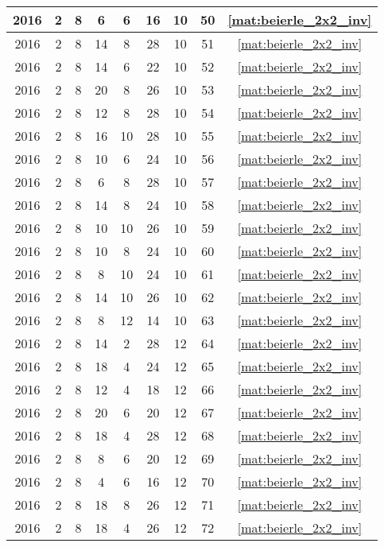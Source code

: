 \begin{longtable}{|c|c|c|c|c|c|c|c|c|}
2016 & 2 & 8 & 6 & 6 & 16 & 10 & 50 & \eqref{mat:beierle_2x2_inv} \\ \hline 
2016 & 2 & 8 & 14 & 8 & 28 & 10 & 51 & \eqref{mat:beierle_2x2_inv} \\ \hline 
2016 & 2 & 8 & 14 & 6 & 22 & 10 & 52 & \eqref{mat:beierle_2x2_inv} \\ \hline 
2016 & 2 & 8 & 20 & 8 & 26 & 10 & 53 & \eqref{mat:beierle_2x2_inv} \\ \hline 
2016 & 2 & 8 & 12 & 8 & 28 & 10 & 54 & \eqref{mat:beierle_2x2_inv} \\ \hline 
2016 & 2 & 8 & 16 & 10 & 28 & 10 & 55 & \eqref{mat:beierle_2x2_inv} \\ \hline 
2016 & 2 & 8 & 10 & 6 & 24 & 10 & 56 & \eqref{mat:beierle_2x2_inv} \\ \hline 
2016 & 2 & 8 & 6 & 8 & 28 & 10 & 57 & \eqref{mat:beierle_2x2_inv} \\ \hline 
2016 & 2 & 8 & 14 & 8 & 24 & 10 & 58 & \eqref{mat:beierle_2x2_inv} \\ \hline 
2016 & 2 & 8 & 10 & 10 & 26 & 10 & 59 & \eqref{mat:beierle_2x2_inv} \\ \hline 
2016 & 2 & 8 & 10 & 8 & 24 & 10 & 60 & \eqref{mat:beierle_2x2_inv} \\ \hline 
2016 & 2 & 8 & 8 & 10 & 24 & 10 & 61 & \eqref{mat:beierle_2x2_inv} \\ \hline 
2016 & 2 & 8 & 14 & 10 & 26 & 10 & 62 & \eqref{mat:beierle_2x2_inv} \\ \hline 
2016 & 2 & 8 & 8 & 12 & 14 & 10 & 63 & \eqref{mat:beierle_2x2_inv} \\ \hline 
2016 & 2 & 8 & 14 & 2 & 28 & 12 & 64 & \eqref{mat:beierle_2x2_inv} \\ \hline 
2016 & 2 & 8 & 18 & 4 & 24 & 12 & 65 & \eqref{mat:beierle_2x2_inv} \\ \hline 
2016 & 2 & 8 & 12 & 4 & 18 & 12 & 66 & \eqref{mat:beierle_2x2_inv} \\ \hline 
2016 & 2 & 8 & 20 & 6 & 20 & 12 & 67 & \eqref{mat:beierle_2x2_inv} \\ \hline 
2016 & 2 & 8 & 18 & 4 & 28 & 12 & 68 & \eqref{mat:beierle_2x2_inv} \\ \hline 
2016 & 2 & 8 & 8 & 6 & 20 & 12 & 69 & \eqref{mat:beierle_2x2_inv} \\ \hline 
2016 & 2 & 8 & 4 & 6 & 16 & 12 & 70 & \eqref{mat:beierle_2x2_inv} \\ \hline 
2016 & 2 & 8 & 18 & 8 & 26 & 12 & 71 & \eqref{mat:beierle_2x2_inv} \\ \hline 
2016 & 2 & 8 & 18 & 4 & 26 & 12 & 72 & \eqref{mat:beierle_2x2_inv} \\ \hline 

\end{longtable}
